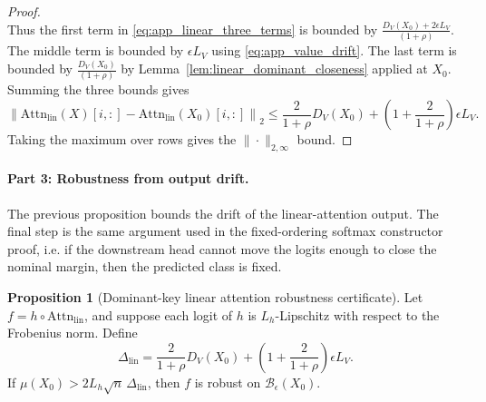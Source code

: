 \documentclass{article}
\theoremstyle{definition}
\newtheorem{proposition}[theorem]{Proposition}
\begin{document}
\begin{proof}
\begin{equation}
\label{eq:app_linear_value_spread_perturbed}
\end{equation}
Thus the first term in \eqref{eq:app_linear_three_terms} is bounded by $\frac{D_V(X_0)+2\epsilon L_V}{(1+\rho)}$. The middle term is bounded by $\epsilon L_V$ using \eqref{eq:app_value_drift}. The last term is bounded by $\frac{D_V(X_0)}{(1+\rho)}$ by Lemma~\ref{lem:linear_dominant_closeness} applied at $X_0$. Summing the three bounds gives
\begin{equation}
    \left\|
    \mathrm{Attn}_{\mathrm{lin}}(X)[i,:]-
    \mathrm{Attn}_{\mathrm{lin}}(X_0)[i,:]
    \right\|_2
    \leq
    \frac{2}{1+\rho}D_V(X_0)
    +
    \left(
        1+\frac{2}{1+\rho}
    \right)
    \epsilon L_V.
\end{equation}
Taking the maximum over rows gives the $\|\cdot\|_{2,\infty}$ bound.
\end{proof}

\paragraph{Part 3: Robustness from output drift.}
The previous proposition bounds the drift of the linear-attention output. The final step is the same argument used in the fixed-ordering softmax constructor proof, i.e. if the downstream head cannot move the logits enough to close the nominal margin, then the predicted class is fixed.

\begin{proposition}[Dominant-key linear attention robustness certificate]
\label{prop:linear_attention_robustness}
Let $f=h\circ\mathrm{Attn}_{\mathrm{lin}}$, and suppose each logit of $h$ is $L_h$-Lipschitz with respect to the Frobenius norm. Define
\begin{equation}
    \Delta_{\mathrm{lin}}
    =
    \frac{2}{1+\rho}D_V(X_0)
    +
    \left(
        1+\frac{2}{1+\rho}
    \right)
    \epsilon L_V.
    \label{eq:app_linear_delta}
\end{equation}
If $\mu(X_0)>2L_h\sqrt n\,\Delta_{\mathrm{lin}}$, then $f$ is robust on $\mathcal B_\epsilon(X_0)$.
\end{proposition}
\end{document}
